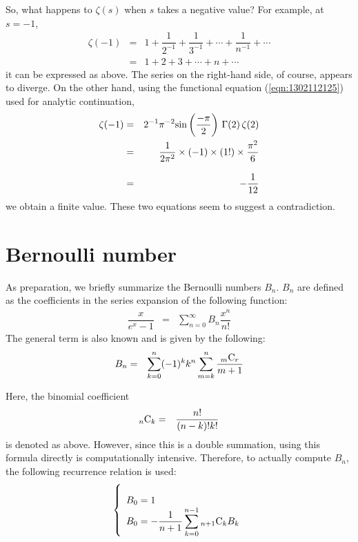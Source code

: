 \documentclass[uplatex,a4j,12pt,dvipdfmx]{jsarticle}
\begin{document}
So, what happens to $\zeta(s)$ when $s$ takes a negative value? For example, at $s=-1$,
\begin{eqnarray}
	\zeta(-1)
	&=&
	1
	+
	\dfrac{1}{2^{-1}}
	+
	\dfrac{1}{3^{-1}}
	+
	\cdots
	+
	\dfrac{1}{n^{-1}}
	+
	\cdots
	\nonumber \\[3mm] &=&
	1+2+3+\cdots+n+\cdots
\end{eqnarray}
it can be expressed as above. The series on the right-hand side, of course, appears to diverge.
On the other hand, using the functional equation (\ref{eqn:1302112125}) used for analytic continuation,
\begin{eqnarray}
	\zeta(-1)
	&=&
	2^{-1}
	\pi^{-2}
	{\rm sin}
	\left(
	\frac{- \pi}{2}
	\right)
	\ \!
	\Gamma(2)
	\ \!
	\zeta(2)
	\nonumber \\ &=&
	\frac{1}{2 \pi^{2}}
	\times
	(-1)
	\times
	(1!)
	\times
	\frac{\pi^{2}}{6}
	\nonumber \\[3mm] &=&
	- \frac{1}{12}
\end{eqnarray}
we obtain a finite value. These two equations seem to suggest a contradiction.

\section{Bernoulli number}

As preparation, we briefly summarize the Bernoulli numbers $B_{n}$.
$B_{n}$ are defined as the coefficients in the series expansion of the following function:
\begin{eqnarray}
	\dfrac{x}{e^{x}-1}
	&=&
	\sum_{n=0}^{\infty}
	B_{n}
	\dfrac{x^{n}}{n!}
\end{eqnarray}
The general term is also known and is given by the following:
\begin{eqnarray}
	B_{n}
	&=&
	\sum_{k=0}^{n}
	(-1)^{k}
	k^{n}
	\sum_{m=k}^{n}
	\dfrac{{_{m}}{\rm C}_{r}}{m+1}
\end{eqnarray}




Here, the binomial coefficient
\begin{eqnarray}
	{_{n}}{\rm C}_{k}
	&=&
	\dfrac{n!}{(n-k)!k!}
\end{eqnarray}
is denoted as above.
However, since this is a double summation, using this formula directly is computationally intensive.
Therefore, to actually compute $B_{n}$, the following recurrence relation is used:
\begin{eqnarray}
	\left\{
	\begin{array}{l}
		\\
		B_{0} = 1 \\
		B_{0} = -\dfrac{1}{n+1} \displaystyle \sum_{k=0}^{n-1} {_{n+1}}{\rm C}_{k} B_{k}
	\end{array}
	\right.
\end{eqnarray}
\end{document}
